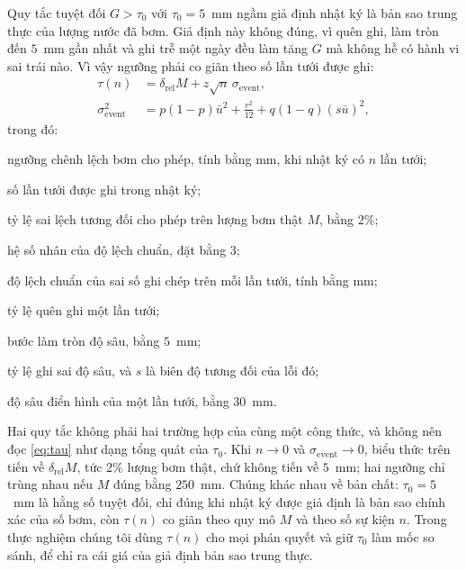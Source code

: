 Quy tắc tuyệt đối $G>\tau_0$ với $\tau_0=5$~mm ngầm giả định nhật ký là bản sao
trung thực của lượng nước đã bơm. Giả định này không đúng, vì quên ghi, làm tròn
đến $5$~mm gần nhất và ghi trễ một ngày đều làm tăng $G$ mà không hề có hành vi
sai trái nào. Vì vậy ngưỡng phải co giãn theo số lần tưới được ghi:
\begin{equation}
\begin{aligned}
\tau(n)&=\delta_{\mathrm{rel}}M+z\sqrt{n}\,\sigma_{\mathrm{event}},\\
\sigma_{\mathrm{event}}^{2}&=p(1-p)\bar u^{2}+\tfrac{r^{2}}{12}
+q(1-q)(s\bar u)^{2},
\end{aligned}
\label{eq:tau}
\end{equation}
trong đó:
\begin{symbolist}
\item[$\tau(n)$] ngưỡng chênh lệch bơm cho phép, tính bằng mm, khi nhật ký có $n$ lần tưới;
\item[$n$] số lần tưới được ghi trong nhật ký;
\item[$\delta_{\mathrm{rel}}$] tỷ lệ sai lệch tương đối cho phép trên lượng bơm thật $M$, bằng $2\%$;
\item[$z$] hệ số nhân của độ lệch chuẩn, đặt bằng $3$;
\item[$\sigma_{\mathrm{event}}$] độ lệch chuẩn của sai số ghi chép trên mỗi lần tưới, tính bằng mm;
\item[$p$] tỷ lệ quên ghi một lần tưới;
\item[$r$] bước làm tròn độ sâu, bằng $5$~mm;
\item[$q$] tỷ lệ ghi sai độ sâu, và $s$ là biên độ tương đối của lỗi đó;
\item[$\bar u$] độ sâu điển hình của một lần tưới, bằng $30$~mm.
\end{symbolist} Hai quy tắc không phải hai trường hợp của cùng một công thức, và
không nên đọc \eqref{eq:tau} như dạng tổng quát của $\tau_0$. Khi
$n\to0$ và $\sigma_{\mathrm{event}}\to0$, biểu thức trên tiến về
$\delta_{\mathrm{rel}}M$, tức $2\%$ lượng bơm thật, chứ không tiến về $5$~mm; hai
ngưỡng chỉ trùng nhau nếu $M$ đúng bằng $250$~mm. Chúng khác nhau về bản chất:
$\tau_0=5$~mm là hằng số tuyệt đối, chỉ đúng khi nhật ký được giả định là bản sao
chính xác của số bơm, còn $\tau(n)$ co giãn theo quy mô $M$ và theo số sự kiện
$n$. Trong thực nghiệm chúng tôi dùng $\tau(n)$ cho mọi phán quyết và giữ
$\tau_0$ làm mốc so sánh, để chỉ ra cái giá của giả định bản sao trung thực.

